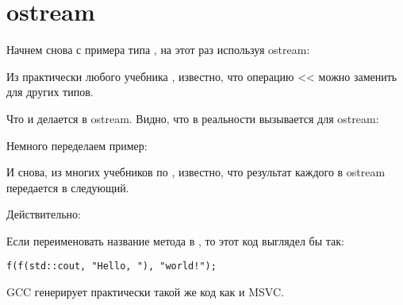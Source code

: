 \section{ostream}

Начнем снова с примера типа , на этот раз используя ostream:



Из практически любого учебника \Cpp, известно, что операцию << можно заменить для других типов.

Что и делается в ostream.
Видно, что в реальности вызывается  для ostream:



Немного переделаем пример:



И снова, из многих учебников по \Cpp, известно, что результат каждого  
в ostream передается в следующий.

Действительно:



Если переименовать название метода  в \ttf{}, то этот код выглядел бы так:

\begin{lstlisting}
f(f(std::cout, "Hello, "), "world!");
\end{lstlisting}

GCC генерирует практически такой же код как и MSVC.

